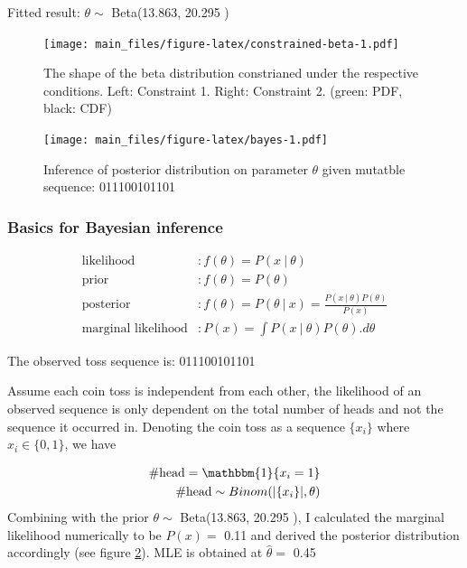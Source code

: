 \documentclass[]{article}
\newcommand{\indicator}{\mathbbm{1}}
\newcommand\gvn[1][]{\:#1\vert\:}
\theoremstyle{definition}
\theoremstyle{definition}
\theoremstyle{definition}
\theoremstyle{remark}
\begin{document}
Fitted result: \(\theta\sim\) Beta(13.863, 20.295 )

\begin{figure}
\centering
\texttt{[image: main\_files/figure-latex/constrained-beta-1.pdf]}
\caption{\label{fig:constrained-beta}The shape of the beta distribution
constrianed under the respective conditions. Left: Constraint 1. Right:
Constraint 2. (green: PDF, black: CDF)}
\end{figure}

\begin{figure}
\centering
\texttt{[image: main\_files/figure-latex/bayes-1.pdf]}
\caption{\label{fig:bayes}Inference of posterior distribution on parameter
\(\theta\) given mutatble sequence: 011100101101}
\end{figure}

\subsubsection{\texorpdfstring{Basics for Bayesian inference
\label{sec:bayes-basics}}{Basics for Bayesian inference }}\label{basics-for-bayesian-inference}

\[
\begin{aligned}
\text{likelihood}&: f(\theta) = P(x \gvn \theta) \\
\text{prior}&: f(\theta) = P(\theta) \\
\text{posterior}&: f(\theta)  = P(\theta \gvn x) = \frac{  P(x\gvn \theta) P(\theta)  }{P(x) } \\
\text{marginal likelihood} &: P(x) =  \int P(x\gvn \theta) P(\theta).d\theta
\end{aligned}
\]

The observed toss sequence is: 011100101101

Assume each coin toss is independent from each other, the likelihood of
an observed sequence is only dependent on the total number of heads and
not the sequence it occurred in. Denoting the coin toss as a sequence
\(\{x_i\}\) where \(x_i \in \{0,1\}\), we have

\[
\begin{aligned}
\text{\#head} = \indicator\{x_i=1\} \\
\text{\#head} \sim Binom(|\{x_i\}|,\theta)
\end{aligned}
\] Combining with the prior \(\theta\sim\) Beta(13.863, 20.295 ), I
calculated the marginal likelihood numerically to be \(P(x)=\) 0.11 and
derived the posterior distribution accordingly (see figure
\ref{fig:bayes}). MLE is obtained at \(\hat{\theta}=\) 0.45
\end{document}
